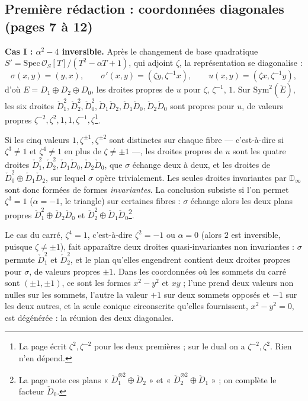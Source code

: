 \documentclass[11pt,a4paper]{article}
\begin{document}
\subsection*{Première rédaction : coordonnées diagonales (pages 7 à 12)}

\textbf{Cas I : $\alpha^2 - 4$ inversible.} Après le changement de base
quadratique $S' = \mathrm{Spec}\,\mathcal{O}_S[T]/(T^2 - \alpha T + 1)$, qui adjoint
$\zeta$, la représentation se diagonalise :
\[
  \sigma(x, y) = (y, x), \qquad \sigma'(x, y) = (\zeta y, \zeta^{-1} x), \qquad
  u(x, y) = (\zeta x, \zeta^{-1} y),
\]
d'où $E = D_1 \oplus D_2 \oplus D_0$, les droites propres de $u$ pour $\zeta$,
$\zeta^{-1}$, $1$. Sur $\mathrm{Sym}^2(\check{E})$, les six droites
$\check{D}_1^{2}, \check{D}_2^{2}, \check{D}_0^{2}, \check{D}_1\check{D}_2,
\check{D}_1\check{D}_0, \check{D}_2\check{D}_0$ sont propres pour $u$, de valeurs
propres $\zeta^{-2}, \zeta^{2}, 1, 1, \zeta^{-1}, \zeta$\footnote{La page écrit
$\zeta^{2}, \zeta^{-2}$ pour les deux premières ; sur le dual on a
$\zeta^{-2}, \zeta^{2}$. Rien n'en dépend.}.

Si les cinq valeurs $1, \zeta^{\pm 1}, \zeta^{\pm 2}$ sont distinctes sur chaque
fibre — c'est-à-dire si $\zeta^3 \neq 1$ et $\zeta^4 \neq 1$ en plus de $\zeta \neq
\pm 1$ —, les droites propres de $u$ sont les quatre droites $\check{D}_1^{2},
\check{D}_2^{2}, \check{D}_1\check{D}_0, \check{D}_2\check{D}_0$, que $\sigma$
échange deux à deux, et les droites de $\check{D}_0^{2} \oplus
\check{D}_1\check{D}_2$, sur lequel $\sigma$ opère trivialement. Les seules droites
invariantes par $\mathbb{D}_\infty$ sont donc formées de formes \emph{invariantes}.
La conclusion subsiste si l'on permet $\zeta^3 = 1$ ($\alpha = -1$, le triangle)
sur certaines fibres : $\sigma$ échange alors les deux plans propres
$\check{D}_1^{2} \oplus \check{D}_2\check{D}_0$ et $\check{D}_2^{2} \oplus
\check{D}_1\check{D}_0$\footnote{La page note ces plans « $\check{D}_1^{\otimes 2}
\oplus \check{D}_2$ » et « $\check{D}_2^{\otimes 2} \oplus \check{D}_1$ » ; on
complète le facteur $\check{D}_0$.}.

Le cas du carré, $\zeta^4 = 1$, c'est-à-dire $\zeta^2 = -1$ ou $\alpha = 0$ (alors
$2$ est inversible, puisque $\zeta \neq \pm 1$), fait apparaître deux droites
quasi-invariantes non invariantes : $\sigma$ permute $\check{D}_1^{2}$ et
$\check{D}_2^{2}$, et le plan qu'elles engendrent contient deux droites propres
pour $\sigma$, de valeurs propres $\pm 1$. Dans les coordonnées où les sommets du
carré sont $(\pm 1, \pm 1)$, ce sont les formes $x^2 - y^2$ et $xy$ ; l'une prend
deux valeurs non nulles sur les sommets, l'autre la valeur $+1$ sur deux sommets
opposés et $-1$ sur les deux autres, et la seule conique circonscrite qu'elles
fournissent, $x^2 - y^2 = 0$, est dégénérée : la réunion des deux diagonales.
\end{document}

